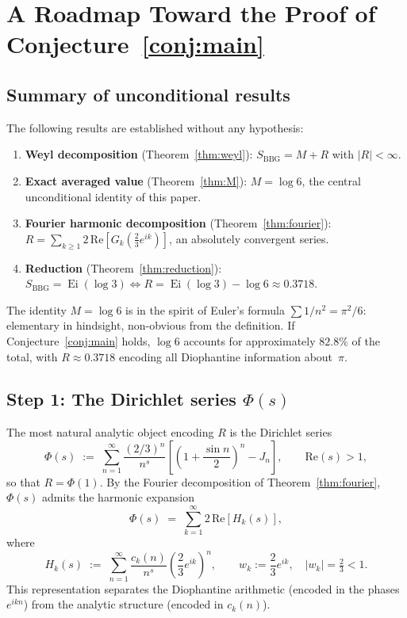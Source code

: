 \documentclass[12pt]{amsart}
\DeclareMathOperator{\Ei}{Ei}
\begin{document}
\section{A Roadmap Toward the Proof of Conjecture~\ref{conj:main}}

\subsection{Summary of unconditional results}

The following results are established without any hypothesis:
\begin{enumerate}[label=(\arabic*)]
\item \textbf{Weyl decomposition} (Theorem~\ref{thm:weyl}):
  $S_{\mathrm{BBG}}=M+R$ with $|R|<\infty$.
\item \textbf{Exact averaged value} (Theorem~\ref{thm:M}):
  $M=\log 6$, the central unconditional identity of this paper.
\item \textbf{Fourier harmonic decomposition} (Theorem~\ref{thm:fourier}):
  $R=\sum_{k\ge 1}2\,\mathrm{Re}[G_k(\tfrac{2}{3}e^{ik})]$,
  an absolutely convergent series.
\item \textbf{Reduction} (Theorem~\ref{thm:reduction}):
  $S_{\mathrm{BBG}}=\Ei(\log 3)\iff R=\Ei(\log 3)-\log 6\approx 0.3718$.
\end{enumerate}

\noindent
The identity $M=\log 6$ is in the spirit of Euler's formula
$\sum 1/n^2=\pi^2/6$: elementary in hindsight, non-obvious from
the definition.  If Conjecture~\ref{conj:main} holds, $\log 6$
accounts for approximately $82.8\%$ of the total, with $R\approx 0.3718$
encoding all Diophantine information about~$\pi$.

\subsection{Step 1: The Dirichlet series $\Phi(s)$}

The most natural analytic object encoding $R$ is the Dirichlet series
\begin{equation}\label{eq:Phi}
  \Phi(s) \;:=\; \sum_{n=1}^{\infty}
  \frac{(2/3)^n}{n^s}
  \!\left[\!\left(1+\frac{\sin n}{2}\right)^{\!n}-J_n\right],
  \qquad \mathrm{Re}(s)>1,
\end{equation}
so that $R=\Phi(1)$.  By the Fourier decomposition of
Theorem~\ref{thm:fourier}, $\Phi(s)$ admits the harmonic expansion
\begin{equation}\label{eq:Phi-harmonic}
  \Phi(s) \;=\; \sum_{k=1}^{\infty} 2\,\mathrm{Re}\!\left[H_k(s)\right],
\end{equation}
where
\begin{equation}\label{eq:Hk}
  H_k(s) \;:=\; \sum_{n=1}^{\infty}
               \frac{c_k(n)}{n^s}\!\left(\frac{2}{3}e^{ik}\right)^{\!n},
  \qquad w_k:=\frac{2}{3}e^{ik},\quad |w_k|=\tfrac{2}{3}<1.
\end{equation}
This representation separates the Diophantine arithmetic (encoded in
the phases $e^{ikn}$) from the analytic structure (encoded in
$c_k(n)$).
\end{document}
